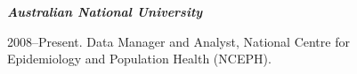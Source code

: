 \documentclass[a4paper,11pt]{article}
\begin{document}





{}


\bigskip
\medskip
\noindent\emph{\textbf{Australian National University} \vspace{0.01in}}

2008--Present.  Data Manager and Analyst, National Centre for \\
\ind Epidemiology and Population Health (NCEPH). 
\end{document}
